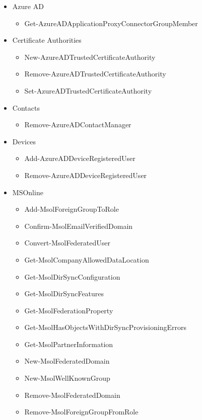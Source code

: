 \begin{itemize}
    \item Azure AD
    \begin{itemize}
        \item Get-AzureADApplicationProxyConnectorGroupMember
    \end{itemize}
    \item Certificate Authorities
    \begin{itemize}
        \item New-AzureADTrustedCertificateAuthority
        \item Remove-AzureADTrustedCertificateAuthority
        \item Set-AzureADTrustedCertificateAuthority
    \end{itemize}
    \item Contacts
    \begin{itemize}
        \item Remove-AzureADContactManager
    \end{itemize}
    \item Devices
    \begin{itemize}
        \item Add-AzureADDeviceRegisteredUser
        \item Remove-AzureADDeviceRegisteredUser
    \end{itemize}
    \item MSOnline
    \begin{itemize}
        \item Add-MsolForeignGroupToRole
        \item Confirm-MsolEmailVerifiedDomain
        \item Convert-MsolFederatedUser
        \item Get-MsolCompanyAllowedDataLocation
        \item Get-MsolDirSyncConfiguration
        \item Get-MsolDirSyncFeatures
        \item Get-MsolFederationProperty
        \item Get-MsolHasObjectsWithDirSyncProvisioningErrors
        \item Get-MsolPartnerInformation
        \item New-MsolFederatedDomain
        \item New-MsolWellKnownGroup
        \item Remove-MsolFederatedDomain
        \item Remove-MsolForeignGroupFromRole

\end{itemize}
\end{itemize}
